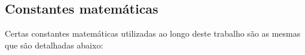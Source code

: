 


\subsection{Constantes matemáticas}
\label{sec:cte_matematicas}
Certas constantes matemáticas utilizadas ao longo deste trabalho são as mesmas que são detalhadas abaixo:

